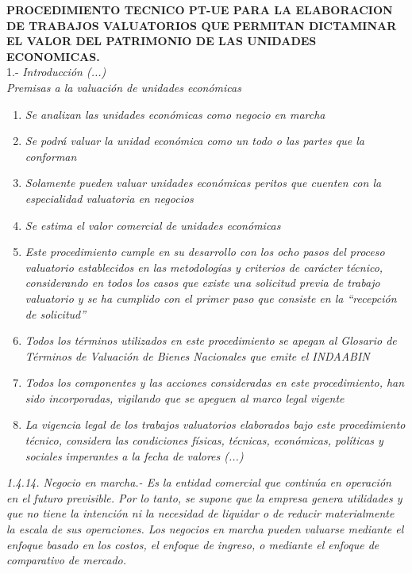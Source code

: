 \textcolor{principal}{\textbf{PROCEDIMIENTO TECNICO PT-UE PARA LA ELABORACION DE TRABAJOS VALUATORIOS QUE PERMITAN DICTAMINAR EL VALOR DEL PATRIMONIO DE LAS UNIDADES ECONOMICAS.}}\\

1.- \textit{Introducci\'on (...)}\\

\textit{Premisas a la valuaci\'on de unidades econ\'omicas}\\
\begin{enumerate}
\item \textit{Se analizan las unidades econ\'omicas como negocio en marcha} 
\item \textit{Se podr\'a valuar la unidad econ\'omica como un todo o las partes que la conforman}
\item \textit{Solamente pueden valuar unidades econ\'omicas peritos que cuenten con la especialidad valuatoria en negocios}
\item \textit{Se estima el valor comercial de unidades econ\'omicas}
\item \textit{Este procedimiento cumple en su desarrollo con los ocho pasos del proceso valuatorio establecidos en las metodolog\'ias y criterios de car\'acter t\'ecnico, considerando en todos los casos que existe una solicitud previa de trabajo valuatorio y se ha cumplido con el primer paso que consiste en la ``recepci\'on de solicitud''}
\item \textit{Todos los t\'erminos utilizados en este procedimiento se apegan al Glosario de T\'erminos de Valuaci\'on de Bienes Nacionales que emite el INDAABIN}
\item \textit{Todos los componentes y las acciones consideradas en este procedimiento, han sido incorporadas, vigilando que se apeguen al marco legal vigente}
\item \textit{La vigencia legal de los trabajos valuatorios elaborados bajo este procedimiento t\'ecnico, considera las condiciones f\'isicas, t\'ecnicas, econ\'omicas, pol\'iticas y sociales imperantes a la fecha de valores (...)} 
\end{enumerate}

\textit{\textcolor{principal}{1.4.14. Negocio en marcha}.- Es la entidad comercial que contin\'ua en operaci\'on en el futuro previsible. Por lo tanto, se supone que la empresa genera utilidades y que no tiene la intenci\'on ni la necesidad de liquidar o de reducir materialmente la escala de sus operaciones. Los negocios en marcha pueden valuarse mediante el enfoque basado en los costos, el enfoque de ingreso, o mediante el enfoque de comparativo de mercado.}\\

